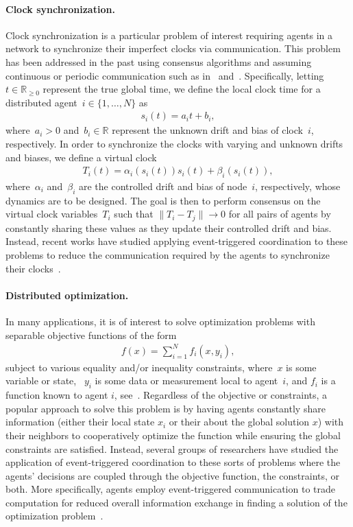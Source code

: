 \documentclass{autart}
\newcommand{\real}{{\mathbb{R}}}
\newcommand{\realnonnegative}{\mathbb{R}_{\ge 0}}
\newcommand{\until}[1]{\{1,\dots, #1\}}
\newcommand{\TwoNorm}[1]{\|#1\|}
\begin{document}
\paragraph*{Clock synchronization.} Clock synchronization is a
particular problem of interest requiring agents in a network to
synchronize their imperfect clocks via communication. This problem has
been addressed in the past using consensus algorithms and assuming
continuous or periodic communication such as in~\citep{LS-FF:11}
and~\citep{RC-SZ:14}.  {Specifically, letting~$t \in
  \realnonnegative$ represent the true global time, we define the
  local clock time for a distributed agent~$i \in \until{N}$ as
  \begin{align*}
    s_i(t) = a_i t + b_i,
  \end{align*}
  where~$a_i > 0$ and~$b_i \in \real$ represent the unknown drift and
  bias of clock~$i$, respectively. In order to synchronize the clocks
  with varying and unknown drifts and biases, we define a virtual
  clock
  \begin{align*}
    T_i(t) = \alpha_i(s_i(t)) s_i(t) + \beta_i(s_i(t)),
  \end{align*}
  where~$\alpha_i$ and~$\beta_i$ are the controlled drift and bias of
  node~$i$, respectively, whose dynamics are to be designed. The goal
  is then to perform consensus on the virtual clock variables~$T_i$
  such that $\TwoNorm{T_i - T_j} \rightarrow 0$ for all pairs of
  agents by constantly sharing these values as they update their
  controlled drift and bias.  } Instead, recent works have studied
applying event-triggered coordination to these problems to reduce the
communication required by the agents to synchronize their
clocks~\citep{YK-HI:15,ZC-DL-YH-CT:15,EG-SM-YC-DWC:17}.

\paragraph*{Distributed optimization.} 
{In many applications, it is of interest to solve optimization
  problems with separable objective functions  of the form
  \begin{align*}
    f(x) = \sum_{i=1}^N f_i(x,y_i),
  \end{align*}
  subject to various equality and/or inequality constraints, where~$x$
  is some variable or state, ~$y_i$ is some data or measurement local
  to agent~$i$, and $f_i$ is a function known to agent $i$,
  see~\citep{PW-MDL:09,AN:14-sv}. Regardless of the
  objective or constraints, a popular approach to solve this problem
  is by having agents constantly share information (either their local
  state $x_i$ or their about the global solution $x$) with their
  neighbors to cooperatively optimize the function while ensuring the
  global constraints are satisfied. Instead, several groups of
  researchers have studied the application of event-triggered
  coordination to these sorts of problems where the agents' decisions
  are coupled through the objective function, the constraints, or
  both.}  More specifically, agents employ event-triggered
communication to trade computation for reduced overall information
exchange in finding a solution of the optimization
problem~\citep{MZ-CGC:10,SSK-JC-SM:15-auto,DR-JC:16,JL-WC:16,WC-WR:16}.
\end{document}
